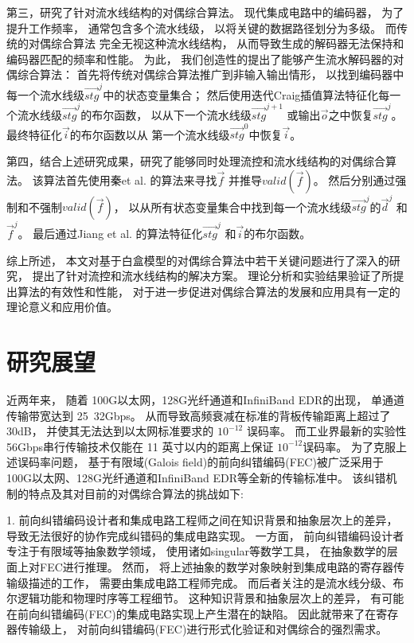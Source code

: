 第三，研究了针对流水线结构的对偶综合算法。
现代集成电路中的编码器，
为了提升工作频率，
通常包含多个流水线级，
以将关键的数据路径划分为多级。
而传统的对偶综合算法
完全无视这种流水线结构，
从而导致生成的解码器无法保持和编码器匹配的频率和性能。
为此，
我们创造性的提出了能够产生流水解码器的对偶综合算法：
首先将传统对偶综合算法推广到非输入输出情形，
以找到编码器中每一个流水线级$\vec{stg}^j$中的状态变量集合；
然后使用迭代Craig插值算法特征化每一个流水线级$\vec{stg}^j$的布尔函数，
以从下一个流水线级$\vec{stg}^{j+1}$ 或输出$\vec{o}$之中恢复$\vec{stg}^j$。
最终特征化$\vec{i}$的布尔函数以从
第一个流水线级$\vec{stg}^0$中恢复$\vec{i}$。

第四，结合上述研究成果，研究了能够同时处理流控和流水线结构的对偶综合算法。
该算法首先使用秦et al. 的算法来寻找$\vec{f}$ 并推导$valid(\vec{f})$。
然后分别通过强制和不强制$valid(\vec{f})$，
以从所有状态变量集合中找到每一个流水线级$\vec{stg}^j$的$\vec{d}^j$ 和$\vec{f}^j$。
最后通过Jiang et al. 的算法特征化$\vec{stg}^j$ 和$\vec{i}$的布尔函数。

综上所述，
本文对基于白盒模型的对偶综合算法中若干关键问题进行了深入的研究，
提出了针对流控和流水线结构的解决方案。
理论分析和实验结果验证了所提出算法的有效性和性能，
对于进一步促进对偶综合算法的发展和应用具有一定的理论意义和应用价值。

\section{研究展望}
近两年来，
随着 100G以太网，128G光纤通道和InfiniBand EDR的出现，
单通道传输带宽达到 25~32Gbps。
从而导致高频衰减在标准的背板传输距离上超过了 30dB，
并使其无法达到以太网标准要求的 $10^{-12}$ 误码率。
而工业界最新的实验性 56Gbps串行传输技术仅能在 11 英寸以内的距离上保证 $10^{-12}$误码率。
为了克服上述误码率问题，
基于有限域(Galois field)的前向纠错编码(FEC)被广泛采用于100G以太网、128G光纤通道和InfiniBand EDR等全新的传输标准中。
该纠错机制的特点及其对目前的对偶综合算法的挑战如下:

1. 前向纠错编码设计者和集成电路工程师之间在知识背景和抽象层次上的差异，
导致无法很好的协作完成纠错码的集成电路实现。
一方面，
前向纠错编码设计者专注于有限域等抽象数学领域，
使用诸如singular等数学工具，
在抽象数学的层面上对FEC进行推理。
然而，
将上述抽象的数学对象映射到集成电路的寄存器传输级描述的工作，
需要由集成电路工程师完成。
而后者关注的是流水线分级、布尔逻辑功能和物理时序等工程细节。
这种知识背景和抽象层次上的差异，
有可能在前向纠错编码(FEC)的集成电路实现上产生潜在的缺陷。
因此就带来了在寄存器传输级上，
对前向纠错编码(FEC)进行形式化验证和对偶综合的强烈需求。


